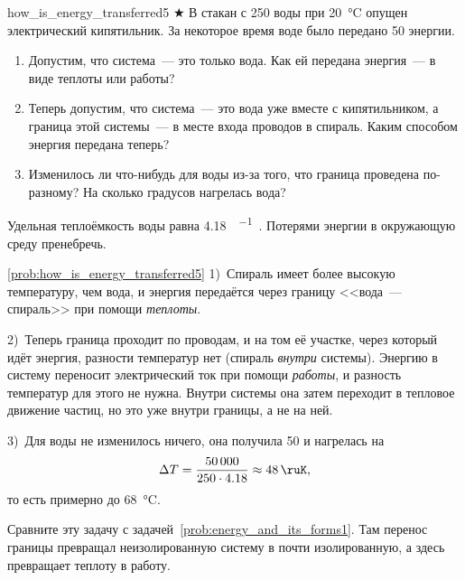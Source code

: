 \begin{problem}{}{how_is_energy_transferred5}
    $\bigstar$ В стакан с \qty{250}{\ruG} воды при \qty{20}{\degreeCelsius} опущен электрический кипятильник. За некоторое время воде было передано \qty{50}{\ruKJ} энергии.

    \begin{enumerate}[label=\arabic*)]
        \item Допустим, что система~--- это только вода. Как ей передана энергия~--- в виде теплоты или работы?
        \item Теперь допустим, что система~--- это вода уже вместе с кипятильником, а граница этой системы~--- в месте входа проводов в спираль. Каким способом энергия передана теперь?
        \item Изменилось ли что-нибудь для воды из-за того, что граница проведена по-разному? На сколько градусов нагрелась вода?
    \end{enumerate}

    Удельная теплоёмкость воды равна \qty{4,18}{\ruJ\per\ruG\ruK}. Потерями энергии в окружающую среду пренебречь.
    \begin{sol}{\ref{prob:how_is_energy_transferred5}}
        1)~Спираль имеет более высокую температуру, чем вода, и энергия передаётся через границу <<вода~--- спираль>> при помощи \emph{теплоты}.

        2)~Теперь граница проходит по проводам, и на том её участке, через который идёт энергия, разности температур нет (спираль \emph{внутри} системы). Энергию в систему переносит электрический ток при помощи \emph{работы}, и разность температур для этого не нужна. Внутри системы она затем переходит в тепловое движение частиц, но это уже внутри границы, а не на ней.

        3)~Для воды не изменилось ничего, она получила \qty{50}{\ruKJ} и нагрелась на
        \begin{equation*}
            \Delta T = \frac{\num{50000}}{\num{250} \cdot \num{4,18}} \approx \qty{48}{\ruK},
        \end{equation*}
        то есть примерно до \qty{68}{\degreeCelsius}.

        Сравните эту задачу с задачей~\ref{prob:energy_and_its_forms1}. Там перенос границы превращал неизолированную систему в почти изолированную, а здесь превращает теплоту в работу.
    \end{sol}
\end{problem}

